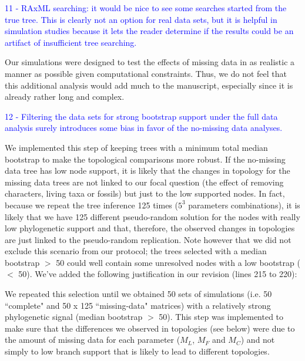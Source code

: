 \documentclass[11pt]{letter}
\begin{document}
\begin{letter}{}

\textcolor{blue}{11 - RAxML searching: it would be nice to see some searches started from the true tree. This is clearly not an option for real data sets, but it is helpful in simulation studies because it lets the reader determine if the results could be an artifact of insufficient tree searching.}

Our simulations were designed to test the effects of missing data in as realistic a manner as possible given computational constraints. Thus, we do not feel that this additional analysis would add much to the manuscript, especially since it is already rather long and complex. 


\textcolor{blue}{12 - Filtering the data sets for strong bootstrap support under the full data analysis surely introduces some bias in favor of the no-missing data analyses.}

We implemented this step of keeping trees with a minimum total median bootstrap to make the topological comparisons more robust. If the no-missing data tree has low node support, it is likely that the changes in topology for the missing data trees are not linked to our focal question (the effect of removing characters, living taxa or fossils) but just to the low supported nodes. In fact, because we repeat the tree inference 125 times ($5^3$ parameters combinations), it is likely that we have 125 different pseudo-random solution for the nodes with really low phylogenetic support and that, therefore, the observed changes in topologies are just linked to the pseudo-random replication. Note however that we did not exclude this scenario from our protocol; the trees selected with a median bootstrap $>$ 50 could well contain some unresolved nodes with a low bootstrap ($<$ 50). We've added the following justification in our revision (lines 215 to 220):

\hfill\begin{minipage}{\dimexpr\textwidth-1cm}
We repeated this selection until we obtained 50 sets of simulations (i.e. 50 ``complete" and 50 x 125 ``missing-data" matrices) with a relatively strong phylogenetic signal (median bootstrap $>$ 50). This step was implemented to make sure that the differences we observed in topologies (see below) were due to the amount of missing data for each parameter ($M_L$, $M_F$ and $M_C$) and not simply to low branch support that is likely to lead to different topologies.
\end{minipage}


\end{letter}
\end{document}
